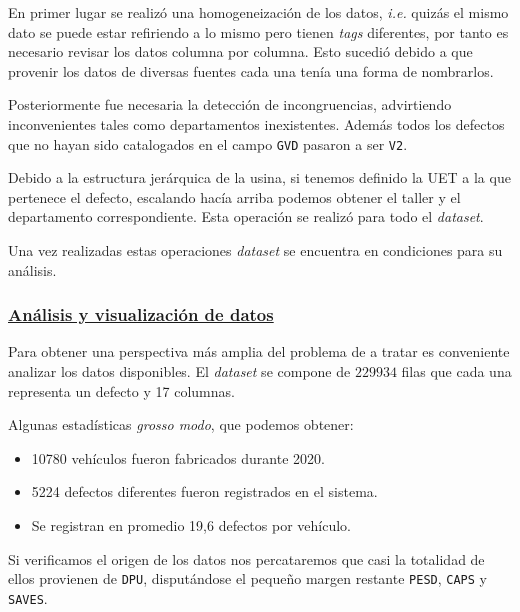 \documentclass[a4paper,12pt]{article}
\begin{document}
En primer lugar se realizó una homogeneización de los datos, \textit{i.e.} quizás el mismo dato se puede estar refiriendo a lo mismo pero tienen \textit{tags} diferentes, por tanto es necesario revisar los datos columna por columna. Esto sucedió debido a que provenir los datos de diversas fuentes cada una tenía una forma de nombrarlos. 

Posteriormente fue necesaria la detección de incongruencias, advirtiendo inconvenientes tales como departamentos inexistentes. Además todos los defectos que no hayan sido catalogados en el campo \texttt{GVD} pasaron a ser \texttt{V2}.

Debido a la estructura jerárquica de la usina, si tenemos definido la UET a la que pertenece el defecto, escalando hacía arriba podemos obtener el taller y el departamento correspondiente. Esta operación se realizó para todo el \textit{dataset}.

Una vez realizadas estas operaciones \textit{dataset} se encuentra en condiciones para su análisis.

\subsubsection{\href{https://github.com/GeraCollante/tesis-icomp-machinelearning/blob/main/DataPlottingAndAnalysis.ipynb}{\color{blue}Análisis y visualización de datos}}
Para obtener una perspectiva más amplia del problema de a tratar es conveniente analizar los datos disponibles. El \textit{dataset} se compone de $229934$ filas que cada una representa un defecto y 17 columnas.

Algunas estadísticas \textit{grosso modo}, que podemos obtener:

\begin{itemize}[noitemsep, topsep=2pt]
	\item 10780 vehículos fueron fabricados durante 2020.
	\item 5224 defectos diferentes fueron registrados en el sistema.
	\item Se registran en promedio 19,6 defectos por vehículo.
\end{itemize}

Si verificamos el origen de los datos nos percataremos que casi la totalidad de ellos provienen de \texttt{DPU}, disputándose el pequeño margen restante \texttt{PESD}, \texttt{CAPS} y \texttt{SAVES}.
\end{document}
